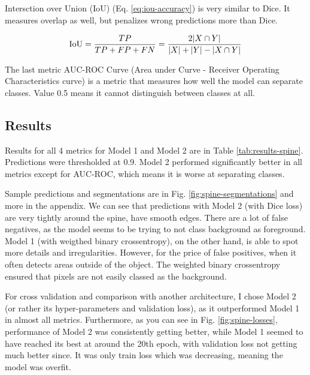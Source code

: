 Intersction over Union (IoU) (Eq. \ref{eq:iou-accuracy}) is very similar to Dice. It measures overlap as well, but penalizes wrong predictions more than Dice. 

\begin{equation}
\label{eq:iou-accuracy}
    \textup{IoU}  = \frac{TP}{TP + FP + FN} = \frac{2|X\cap Y|}{|X|+|Y| - |X\cap Y|}
\end{equation}

The last metric AUC-ROC Curve (Area under Curve - Receiver Operating Characteristics curve) is a metric that measures how well the model can separate classes. Value 0.5 means it cannot distinguish between classes at all.   

\subsection{Results}
Results for all 4 metrics for Model 1 and Model 2 are in Table \ref{tab:results-spine}. Predictions were thresholded at 0.9. Model 2 performed significantly better in all metrics except for AUC-ROC, which means it is worse at separating classes. 

Sample predictions and segmentations are in Fig. \ref{fig:spine-segmentations} and more in the appendix. We can see that predictions with Model 2 (with Dice loss) are very tightly around the spine, have smooth edges. There are a lot of false negatives, as the model seems to be trying to not class background as foreground. Model 1 (with weigthed binary crossentropy), on the other hand, is able to spot more details and irregularities. However, for the price of false positives, when it often detects areas outside of the object. The weighted binary crossentropy ensured that pixels are not easily classed as the background.

For cross validation and comparison with another architecture, I chose Model 2 (or rather its hyper-parameters and validation loss), as it outperformed Model 1 in almost all metrics. Furthermore, as you can see in Fig. \ref{fig:spine-losses}, performance of Model 2 was consistently getting better, while Model 1 seemed to have reached its best at around the 20th epoch, with validation loss not getting much better since. It was only train loss which was decreasing, meaning the model was overfit.  

